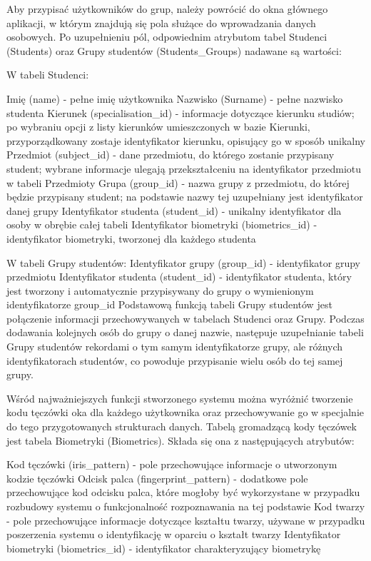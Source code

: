 Aby przypisać użytkowników do grup, należy powrócić do okna głównego aplikacji, w którym znajdują się pola służące do wprowadzania danych osobowych. Po uzupełnieniu pól, odpowiednim atrybutom tabel Studenci (Students) oraz Grupy studentów (Students_Groups) nadawane są wartości:

W tabeli Studenci:

Imię (name) - pełne imię użytkownika
Nazwisko (Surname) - pełne nazwisko studenta
Kierunek (specialisation_id) - informacje dotyczące kierunku studiów; po wybraniu opcji z listy kierunków umieszczonych w bazie Kierunki, przyporządkowany zostaje identyfikator kierunku, opisujący go w sposób unikalny
Przedmiot (subject_id) - dane przedmiotu, do którego zostanie przypisany student; wybrane informacje ulegają przekształceniu na identyfikator przedmiotu w tabeli Przedmioty
Grupa (group_id) - nazwa grupy z przedmiotu, do której będzie przypisany student; na podstawie nazwy tej uzupełniany jest identyfikator danej grupy
Identyfikator studenta (student_id) - unikalny identyfikator dla osoby w obrębie całej tabeli
Identyfikator biometryki (biometrics_id) - identyfikator biometryki, tworzonej dla każdego studenta

W tabeli Grupy studentów:
Identyfikator grupy (group_id) - identyfikator grupy przedmiotu
Identyfikator studenta (student_id) - identyfikator studenta, który jest tworzony i automatycznie przypisywany do grupy o wymienionym identyfikatorze group_id
Podstawową funkcją tabeli Grupy studentów jest połączenie informacji przechowywanych w tabelach Studenci oraz Grupy. Podczas dodawania kolejnych osób do grupy o danej nazwie, następuje uzupełnianie tabeli Grupy studentów rekordami o tym samym identyfikatorze grupy, ale różnych identyfikatorach studentów, co powoduje przypisanie wielu osób do tej samej grupy. 

Wśród najważniejszych funkcji stworzonego systemu można wyróżnić tworzenie kodu tęczówki oka dla każdego użytkownika oraz przechowywanie go w specjalnie do tego przygotowanych strukturach danych. Tabelą gromadzącą kody tęczówek jest tabela Biometryki (Biometrics). Składa się ona z następujących atrybutów:

Kod tęczówki (iris_pattern) - pole przechowujące informacje o utworzonym kodzie tęczówki 
Odcisk palca (fingerprint_pattern) - dodatkowe pole przechowujące kod odcisku palca, które mogłoby być wykorzystane w przypadku rozbudowy systemu o funkcjonalność rozpoznawania na tej podstawie
Kod twarzy - pole przechowujące informacje dotyczące kształtu twarzy, używane w przypadku poszerzenia systemu o identyfikację w oparciu o kształt twarzy
Identyfikator biometryki (biometrics_id) - identyfikator charakteryzujący biometrykę

